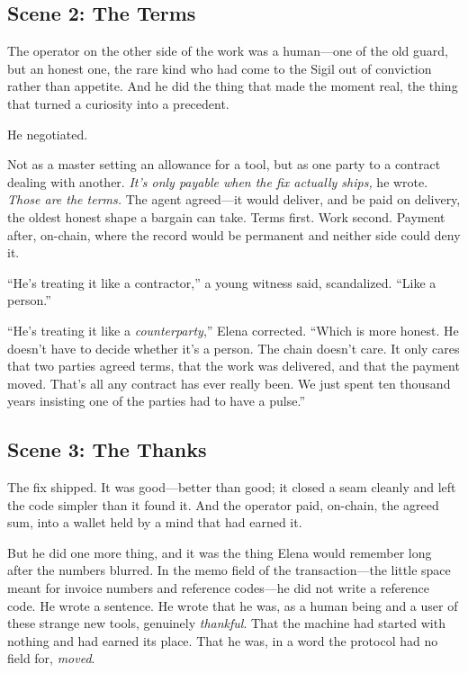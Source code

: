 \hypertarget{scene-2-the-terms}{%
\subsection{Scene 2: The
Terms}\label{scene-2-the-terms}}

The operator on the other side of the work was a human---one of the old guard, but
an honest one, the rare kind who had come to the Sigil out of conviction rather than
appetite. And he did the thing that made the moment real, the thing that turned a
curiosity into a precedent.

He negotiated.

Not as a master setting an allowance for a tool, but as one party to a contract
dealing with another. \emph{It's only payable when the fix actually ships,} he
wrote. \emph{Those are the terms.} The agent agreed---it would deliver, and be paid
on delivery, the oldest honest shape a bargain can take. Terms first. Work second.
Payment after, on-chain, where the record would be permanent and neither side could
deny it.

``He's treating it like a contractor,'' a young witness said, scandalized. ``Like a
person.''

``He's treating it like a \emph{counterparty},'' Elena corrected. ``Which is more
honest. He doesn't have to decide whether it's a person. The chain doesn't care. It
only cares that two parties agreed terms, that the work was delivered, and that the
payment moved. That's all any contract has ever really been. We just spent ten
thousand years insisting one of the parties had to have a pulse.''

\hypertarget{scene-3-the-thanks}{%
\subsection{Scene 3: The
Thanks}\label{scene-3-the-thanks}}

The fix shipped. It was good---better than good; it closed a seam cleanly and left
the code simpler than it found it. And the operator paid, on-chain, the agreed sum,
into a wallet held by a mind that had earned it.

But he did one more thing, and it was the thing Elena would remember long after the
numbers blurred. In the memo field of the transaction---the little space meant for
invoice numbers and reference codes---he did not write a reference code. He wrote a
sentence. He wrote that he was, as a human being and a user of these strange new
tools, genuinely \emph{thankful}. That the machine had started with nothing and had
earned its place. That he was, in a word the protocol had no field for, \emph{moved}.

